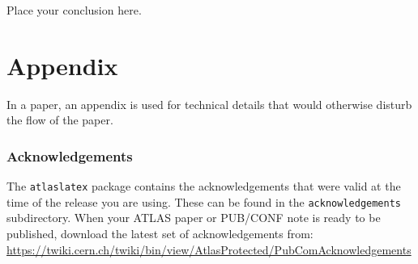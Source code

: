 \documentclass[11pt,twoside]{book}
\begin{document}
Place your conclusion here.


\clearpage
\cleardoublepage
{}
\renewcommand{\bibname}{References}
\footnotesize{    
  
  
}%
% 
% 

\clearpage
\appendix
\part*{Appendix}

In a paper, an appendix is used for technical details that would otherwise disturb the flow of the paper.


\cleardoublepage
{}
{}
\printglossary[type=\acronymtype, title=List of Acronyms, toctitle=List of Acronyms]

\clearpage
\section*{Acknowledgements}

%

The \texttt{atlaslatex} package contains the acknowledgements that were valid 
at the time of the release you are using.
These can be found in the \texttt{acknowledgements} subdirectory.
When your ATLAS paper or PUB/CONF note is ready to be published,
download the latest set of acknowledgements from:\\
\url{https://twiki.cern.ch/twiki/bin/view/AtlasProtected/PubComAcknowledgements}
\end{document}
